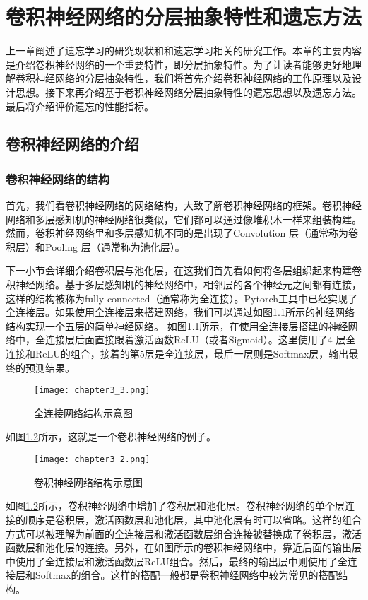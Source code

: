 
\chapter{卷积神经网络的分层抽象特性和遗忘方法}
上一章阐述了遗忘学习的研究现状和和遗忘学习相关的研究工作。本章的主要内容是介绍卷积神经网络的一个重要特性，即分层抽象特性。为了让读者能够更好地理解卷积神经网络的分层抽象特性，我们将首先介绍卷积神经网络的工作原理以及设计思想。接下来再介绍基于卷积神经网络分层抽象特性的遗忘思想以及遗忘方法。最后将介绍评价遗忘的性能指标。

\section{卷积神经网络的介绍}

\subsection{卷积神经网络的结构}

首先，我们看卷积神经网络的网络结构，大致了解卷积神经网络的框架。卷积神经网络和多层感知机的神经网络很类似，它们都可以通过像堆积木一样来组装构建。然而，卷积神经网络里和多层感知机不同的是出现了Convolution 层（通常称为卷积层）和Pooling 层（通常称为池化层）。

下一小节会详细介绍卷积层与池化层，在这我们首先看如何将各层组织起来构建卷积神经网络。基于多层感知机的神经网络中，相邻层的各个神经元之间都有连接，这样的结构被称为fully-connected（通常称为全连接）。Pytorch工具中已经实现了全连接层。如果使用全连接层来搭建网络，我们可以通过如图\ref{fig:chapter3_3}所示的神经网络结构实现一个五层的简单神经网络。
如图\ref{fig:chapter3_3}所示，在使用全连接层搭建的神经网络中，全连接层后面直接跟着激活函数ReLU（或者Sigmoid）。这里使用了4 层全连接和ReLU的组合，接着的第5层是全连接层，最后一层则是Softmax层，输出最终的预测结果。
\begin{figure}
    \centering
    \texttt{[image: chapter3\_3.png]}
    \caption{全连接网络结构示意图\cite{luyujie_202}}
    \label{fig:chapter3_3}
\end{figure}
如图\ref{fig:chapter3_2}所示，这就是一个卷积神经网络的例子。
\begin{figure}
    \centering
    \texttt{[image: chapter3\_2.png]}
    \caption{卷积神经网络结构示意图\cite{luyujie_202}}
    \label{fig:chapter3_2}
\end{figure}
如图\ref{fig:chapter3_2}所示，卷积神经网络中增加了卷积层和池化层。卷积神经网络的单个层连接的顺序是卷积层，激活函数层和池化层，其中池化层有时可以省略。这样的组合方式可以被理解为前面的全连接层和激活函数层组合连接被替换成了卷积层，激活函数层和池化层的连接。另外，在如图所示的卷积神经网络中，靠近后面的输出层中使用了全连接层和激活函数层ReLU组合。然后，最终的输出层中则使用了全连接层和Softmax的组合。这样的搭配一般都是卷积神经网络中较为常见的搭配结构。
